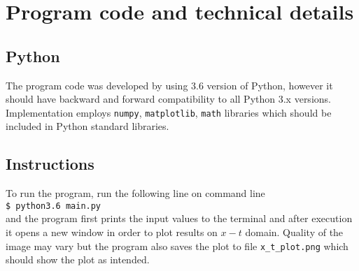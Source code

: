 \documentclass[]{article}
\begin{document}
\section{Program code and technical details}

\subsection{Python}
The program code was developed by using 3.6 version of Python, however it should have backward and forward compatibility to all Python 3.x versions. Implementation employs \texttt{numpy}, \texttt{matplotlib}, \texttt{math} libraries which should be included in Python standard libraries.

\subsection{Instructions}
To run the program, run the following line on command line \\
\texttt{\$ python3.6 main.py} \\
and the program first prints the input values to the terminal and after execution it opens a new window in order to plot results on $x-t$ domain. Quality of the image may vary but the program also saves the plot to file \texttt{x\_t\_plot.png} which should show the plot as intended.
\end{document}
